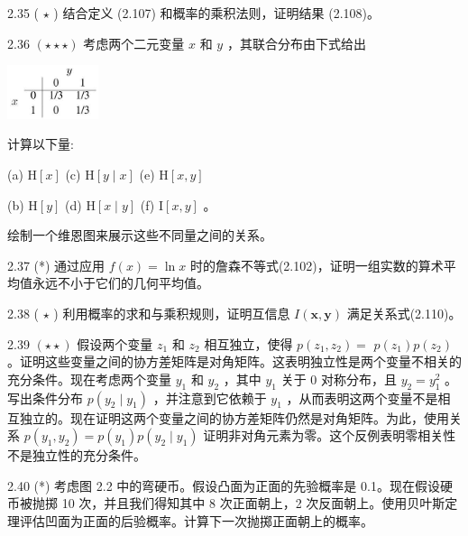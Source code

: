 \documentclass[10pt]{article}
\begin{document}
2.35 ( \(\star\) ) 结合定义 (2.107) 和概率的乘积法则，证明结果 (2.108)。

2.36 \(\left( {\star  \star   \star  }\right)\) 考虑两个二元变量 \(x\) 和 \(y\) ，其联合分布由下式给出

\begin{center}
\includegraphics[max width=0.2\textwidth]{images/0194e279-9b28-703a-88f4-c3ac21e2010d_81_880_872_262_155_0.jpg}
\end{center}
\hspace*{3em} 

计算以下量:

(a) \(\mathrm{H}\left\lbrack  x\right\rbrack\) (c) \(\mathrm{H}\left\lbrack  {y \mid  x}\right\rbrack\) (e) \(\mathrm{H}\left\lbrack  {x,y}\right\rbrack\)

(b) \(\mathrm{H}\left\lbrack  y\right\rbrack\) (d) \(\mathrm{H}\left\lbrack  {x \mid  y}\right\rbrack\) (f) \(\mathrm{I}\left\lbrack  {x,y}\right\rbrack\) 。

绘制一个维恩图来展示这些不同量之间的关系。

2.37 (*) 通过应用 \(f\left( x\right)  = \ln x\) 时的詹森不等式(2.102)，证明一组实数的算术平均值永远不小于它们的几何平均值。

2.38 ( \(\star\) ) 利用概率的求和与乘积规则，证明互信息 \(I\left( {\mathbf{x},\mathbf{y}}\right)\) 满足关系式(2.110)。

2.39 \(\left( {\star  \star  }\right)\) 假设两个变量 \({z}_{1}\) 和 \({z}_{2}\) 相互独立，使得 \(p\left( {{z}_{1},{z}_{2}}\right)  =\)  \(p\left( {z}_{1}\right) p\left( {z}_{2}\right)\) 。证明这些变量之间的协方差矩阵是对角矩阵。这表明独立性是两个变量不相关的充分条件。现在考虑两个变量 \({y}_{1}\) 和 \({y}_{2}\) ，其中 \({y}_{1}\) 关于 0 对称分布，且 \({y}_{2} = {y}_{1}^{2}\) 。写出条件分布 \(p\left( {{y}_{2} \mid  {y}_{1}}\right)\) ，并注意到它依赖于 \({y}_{1}\) ，从而表明这两个变量不是相互独立的。现在证明这两个变量之间的协方差矩阵仍然是对角矩阵。为此，使用关系 \(p\left( {{y}_{1},{y}_{2}}\right)  = p\left( {y}_{1}\right) p\left( {{y}_{2} \mid  {y}_{1}}\right)\) 证明非对角元素为零。这个反例表明零相关性不是独立性的充分条件。

2.40 (*) 考虑图 2.2 中的弯硬币。假设凸面为正面的先验概率是 0.1。现在假设硬币被抛掷 10 次，并且我们得知其中 8 次正面朝上，2 次反面朝上。使用贝叶斯定理评估凹面为正面的后验概率。计算下一次抛掷正面朝上的概率。
\end{document}
